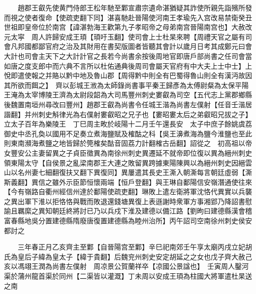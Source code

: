 　　趙郡王叡先使黄門侍郎王松年馳至鄴宣肅宗遺命湛猶疑其詐使所親先詣殯所發而視之使者復命【使疏吏翻下同】湛喜馳赴晉陽使河南王孝瑜先入宫改易禁衛癸丑世祖即皇帝位於南宫【諱湛勃海王歡第九子孝昭帝之母弟南宫晉陽南宫也】大赦改元太寜　周人許歸安成王頊【頊吁玉翻】使司會上士杜杲來聘【周禮天官之屬有司會凡邦國都鄙官府之治及其財用在書契版圖者皆聽其會計以歲月日考其成鄭元曰會大計也司會主天下之大計計官之長若今尚書余按後周地官即唐戶部尚書之任司會當如唐之度支郎中而六典不言所以杜佑通典後周司會屬天官府有中大夫上士中士】上悅即遣使報之并賂以黔中地及魯山郡【周得黔中則全有巴蜀得魯山則全有漢沔故因其所欲而餌之】　齊以彭城王浟為太師錄尚書事平秦王歸彥為太傅尉粲為太保平陽王淹為太宰博陵王濟為太尉段韶為大司馬豐州刺史婁叡為司空【五代志上黨郡鄉縣後魏置南垣州尋改曰豐州】趙郡王叡為尚書令任城王湝為尚書左僕射【任音壬湝居諧翻】并州刺史斛律光為右僕射婁叡昭之兄子也【婁昭婁太后之弟叡昭兄拔之子】立太子百年為樂陵王　丁巳周主畋於岐陽十二月壬午還長安　太子中庶子餘姚虞荔御史中丞孔奐以國用不足奏立煮海鹽賦及榷酤之科【吳王濞煮海為鹽今淮鹽也至此則東南瀕海煮鹽之地皆歸於筦榷矣酤音固荔力計翻榷古岳翻】詔從之　初高祖以帝女豐安公主妻留異之子貞臣徵異為南徐州刺史異遷延不就帝即位復以異為縉州刺史領東陽太守【自侯景之亂梁南郡王大連之敗留異跨據東陽陳興以為縉州刺史因縉雲山以名州妻七細翻復扶又翻下異復同】異屢遣其長史王澌入朝澌每言朝廷虛弱【澌斯義翻】異信之雖外示臣節恒懷兩端【恒戶登翻】與王琳自鄱陽信安嶺潛通使往來【今有嶺路自衢州經信州達於鄱陽使疏吏翻】琳敗上遣左衛將軍沈恪代異實以兵襲之異出軍下淮以拒恪恪與戰而敗退還錢塘異復上表遜謝時衆軍方事湘郢乃降詔書慰諭且羈縻之異知朝廷終將討已乃以兵戍下淮及建德以備江路【劉昫曰建德縣漢會稽富春縣地吳分置建德縣隋廢唐復置建德縣為睦州治所】丙午詔司空南徐州刺史侯安都討之

　　三年春正月乙亥齊主至鄴【自晉陽宫至鄴】辛巳祀南郊壬午享太廟丙戌立妃胡氏為皇后子緯為皇太子【緯于貴翻】后魏兖州刺史安定胡延之之女也戊子齊大赦己亥以馮翊王潤為尚書左僕射　周凉景公賀蘭祥卒【凉國公景諡也】　壬寅周人鑿河渠於蒲州龍首渠於同州【二渠皆以灌溉】丁未周以安成王頊為柱國大將軍遣杜杲送之南

